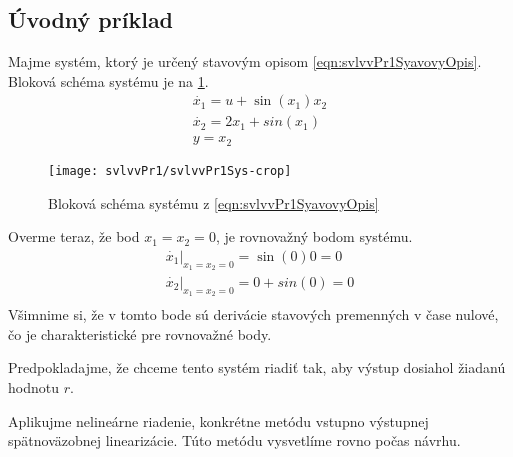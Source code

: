\documentclass[../main.tex]{subfiles}
\begin{document}
	\subsection{Úvodný príklad}
	Majme systém, ktorý je určený stavovým opisom \cref{eqn:svlvvPr1SyavovyOpis}. Bloková schéma systému je na \cref{fig:svlvvPr1BlockSchemaSystemu}.
	\begin{equation}
		\begin{gathered}
		\dot{x_1}  =u + \sin(x_1) x_2 \\
		\dot{x_2} = 2x_1 + sin(x_1) \\
		y = x_2
		\end{gathered}
		\label{eqn:svlvvPr1SyavovyOpis}
	\end{equation}
	\begin{figure}[h!]
		\centering
		\texttt{[image: svlvvPr1/svlvvPr1Sys-crop]}
		\caption{Bloková schéma systému z \cref{eqn:svlvvPr1SyavovyOpis}}
		\label{fig:svlvvPr1BlockSchemaSystemu}
	\end{figure}

	Overme teraz, že bod  $x_1 = x_2 = 0$, je rovnovažný bodom systému.
	\begin{equation*}
	\begin{gathered}
	\dot{x_1}|_{x_1 = x_2 = 0}  = \sin(0) 0 = 0 \\
	\dot{x_2}|_{x_1 = x_2 = 0} = 0 + sin(0) = 0 \\
	\end{gathered}
	\label{eqn:svlvvPr1OverenieRB}
	\end{equation*}
	Všimnime si, že v tomto bode sú derivácie stavových premenných v čase nulové, čo je charakteristické pre rovnovažné body.
	
	Predpokladajme, že chceme tento systém riadiť tak, aby výstup dosiahol žiadanú hodnotu $r$.
	
	Aplikujme nelineárne riadenie, konkrétne metódu vstupno výstupnej spätnoväzobnej linearizácie. Túto metódu vysvetlíme rovno počas návrhu. 
	
\end{document}
